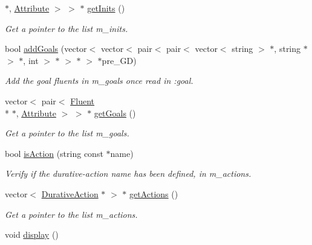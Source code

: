 \begin{DoxyCompactItemize}
$\ast$, \hyperlink{classAttribute}{Attribute} $>$ $>$ $\ast$ \hyperlink{classData_a915f723d120af4837bd5746791bfdc8a}{get\+Inits} ()
\begin{DoxyCompactList}\small\item\em Get a pointer to the list m\+\_\+inits. \end{DoxyCompactList}\item 
bool \hyperlink{classData_add87185f44e1d804657c0eebeaf8ae2c}{add\+Goals} (vector$<$ vector$<$ pair$<$ pair$<$ vector$<$ string $>$ $\ast$, string $\ast$ $>$ $\ast$, int $>$ $\ast$ $>$ $\ast$ $>$ $\ast$pre\+\_\+\+G\+D)
\begin{DoxyCompactList}\small\item\em Add the goal fluents in m\+\_\+goals once read in \+:goal. \end{DoxyCompactList}\item 
vector$<$ pair$<$ \hyperlink{classFluent}{Fluent} \\*
$\ast$, \hyperlink{classAttribute}{Attribute} $>$ $>$ $\ast$ \hyperlink{classData_a631b33415dab9a790804d289bc28ecbc}{get\+Goals} ()
\begin{DoxyCompactList}\small\item\em Get a pointer to the list m\+\_\+goals. \end{DoxyCompactList}\item 
bool \hyperlink{classData_a45b34ea5c6736c80751955960bca0ffe}{is\+Action} (string const $\ast$name)
\begin{DoxyCompactList}\small\item\em Verify if the durative-\/action name has been defined, in m\+\_\+actions. \end{DoxyCompactList}\item 
vector$<$ \hyperlink{classDurativeAction}{Durative\+Action} $\ast$ $>$ $\ast$ \hyperlink{classData_a240c4f180de6fecdc27828f7372bc097}{get\+Actions} ()
\begin{DoxyCompactList}\small\item\em Get a pointer to the list m\+\_\+actions. \end{DoxyCompactList}\item 
\hypertarget{classData_a636be6b2bdfbdc7c7443f8ec8f355050}{void \hyperlink{classData_a636be6b2bdfbdc7c7443f8ec8f355050}{display} ()}\label{classData_a636be6b2bdfbdc7c7443f8ec8f355050}


\end{DoxyCompactItemize}
